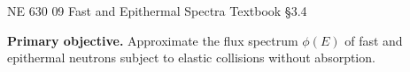 %

\providecommand{\ndensity}{n^{\prime\prime\prime}}
\providecommand{\sfission}{s_f^{\prime\prime\prime}}
\providecommand{\dd}{\,\mathrm{d}}
\providecommand{\SourceEq}[1]{\par\nobreak\hfill{\sffamily\scriptsize\color{KSUGray}#1}\par}

\setlength{\abovedisplayskip}{4pt plus 1pt minus 1pt}
\setlength{\belowdisplayskip}{4pt plus 1pt minus 1pt}
\setlength{\abovedisplayshortskip}{3pt plus 1pt}
\setlength{\belowdisplayshortskip}{3pt plus 1pt}
\setlength{\jot}{2pt}

\HandoutSetup
  {NE 630}
  {09}
  {Fast and Epithermal Spectra}
  {Textbook \S3.4}


\MakeHandoutTitle

\textcolor{KSUDeepPurple}{\textbf{Primary objective.}}
Approximate the flux spectrum $\phi(E)$ of fast and epithermal neutrons
subject to elastic collisions without absorption.
\par\vspace{5pt}

